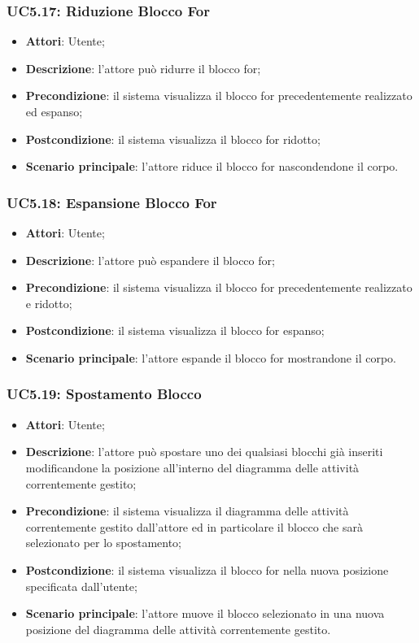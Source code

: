 \begin{itemize}
\begin{itemize}
\begin{itemize}
\begin{itemize}
\subsubsection{UC5.17: Riduzione Blocco For}
\label{UC5.17}
\begin{itemize}
	\item \textbf{Attori}: Utente;
	\item \textbf{Descrizione}: l'attore può ridurre il blocco for;
	\item \textbf{Precondizione}: il sistema visualizza il blocco for precedentemente realizzato ed espanso;
	\item \textbf{Postcondizione}: il sistema visualizza il blocco for ridotto;
	\item \textbf{Scenario principale}: l'attore riduce il blocco for nascondendone il corpo.
\end{itemize}

\subsubsection{UC5.18: Espansione Blocco For}
\label{UC5.18}
\begin{itemize}
	\item \textbf{Attori}: Utente;
	\item \textbf{Descrizione}: l'attore può espandere il blocco for;
	\item \textbf{Precondizione}: il sistema visualizza il blocco for precedentemente realizzato e ridotto;
	\item \textbf{Postcondizione}: il sistema visualizza il blocco for espanso;
	\item \textbf{Scenario principale}: l'attore espande il blocco for mostrandone il corpo.
\end{itemize}

\subsubsection{UC5.19: Spostamento Blocco}
\label{UC5.19}
\begin{itemize}
	\item \textbf{Attori}: Utente;
	\item \textbf{Descrizione}: l'attore può spostare uno dei qualsiasi blocchi già inseriti modificandone la posizione all'interno del diagramma delle attività correntemente gestito;
	\item \textbf{Precondizione}: il sistema visualizza il diagramma delle attività correntemente gestito dall'attore ed in particolare il blocco che sarà selezionato per lo spostamento;
	\item \textbf{Postcondizione}: il sistema visualizza il blocco for nella nuova posizione specificata dall'utente;
	\item \textbf{Scenario principale}: l'attore muove il blocco selezionato in una nuova posizione del diagramma delle attività correntemente gestito.
\end{itemize}


\end{itemize}
\end{itemize}
\end{itemize}
\end{itemize}
